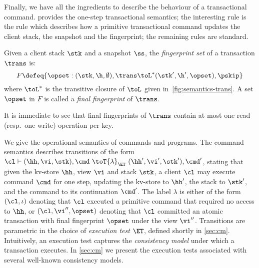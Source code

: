 Finally, we have all the ingredients to describe the behaviour of a transactional command.   provides the one-step transactional semantics; 
the interesting rule is the  rule which describes how a primitive transactional command updates the client stack, the snapshot and the fingerprint; 
the remaining rules are standard.



\begin{definition}
Given a client stack $\stk$ and a snapshot $\ss$, the \emph{fingerprint set} of a transaction $\trans$ is:
\[F \defeq
\{\opset : (\stk, \h, \emptyset), \trans \toL^* (\stk', \h', \opset),
\pskip \}
\]
where $\toL^*$ is the transitive closure of $\toL$ given in~\cref{fig:semantics-trans}.  
A set $\opset$ in $F$ is called a \emph{final fingerprint} of $\trans$. 
\end{definition}
\noindent It is immediate to see that final fingerprints of $\trans$ contain at most one read (resp.\ one write) operation per key.

We give the operational semantics of commands and programs. 
The command semantics describes transitions of the form
$\cl \vdash (\hh, \vi, \stk), \cmd \ \toT{\lambda}_{\ET} \ (\hh', \vi', \stk') ,
\cmd'$, stating that given the kv-store $\hh$, view $\vi$ and stack $\stk$, 
a client $\cl$ may execute command $\cmd$ for one step, updating 
the kv-store to $\hh'$, the stack to $\stk'$, and the command to its continuation $\cmd'$.
The label $\lambda$ is either of the form $(\cl, \iota)$ denoting that $\cl$ executed a primitive command
that required no access to $\hh$, 
or $(\cl, \vi'', \opset)$ denoting that $\cl$ committed an atomic transaction with final fingerprint $\opset$ under the view $\vi''$.
Transitions are parametric in the choice of \emph{execution test} $\ET$, defined shortly in \cref{sec:cm}.
Intuitively, an execution test captures the \emph{consistency model} under which a transaction executes.
In \cref{sec:cm} we present the execution tests associated with several well-known consistency models.  %

